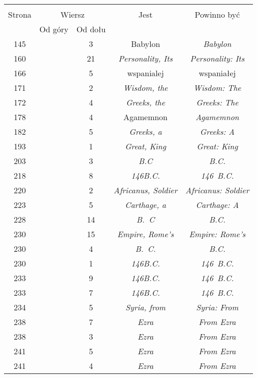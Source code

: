 \documentclass[a4paper,11pt]{article}
\begin{document}
\begin{center}
  \begin{tabular}{|c|c|c|c|c|}
    \hline
    & \multicolumn{2}{c|}{} & & \\
    Strona & \multicolumn{2}{c|}{Wiersz} & Jest
                              & Powinno być \\ \cline{2-3}
    & Od góry & Od dołu & & \\
    \hline
    145 & &  3 & Babylon & \textit{Babylon} \\
    160 & & 21 & \textit{Personality, Its} & \textit{Personality: Its} \\
    166 & &  5 & wspanialej & wspaniałej \\
    171 & &  2 & \textit{Wisdom, the} & \textit{Wisdom: The} \\
    172 & &  4 & \textit{Greeks, the} & \textit{Greeks: The} \\
    178 & &  4 & Agamemnon & \textit{Agamemnon} \\
    182 & &  5 & \textit{Greeks, a} & \textit{Greeks: A} \\
    193 & &  1 & \textit{Great, King} & \textit{Great: King} \\
    203 & &  3 & \textit{B.C} & \textit{B.C.} \\
    218 & &  8 & \textit{146B.C.} & \textit{146~B.C.} \\
    220 & &  2 & \textit{Africanus, Soldier}
           & \textit{Africanus: Soldier} \\
    223 & &  5 & \textit{Carthage, a} & \textit{Carthage: A} \\
    228 & & 14 & \textit{B.~C} & \textit{B.C.} \\
    230 & & 15 & \textit{Empire, Rome's} & \textit{Empire: Rome's} \\
    230 & &  4 & \textit{B.~C.} & \textit{B.C.} \\
    230 & &  1 & \textit{146B.C.} & \textit{146~B.C.} \\
    233 & &  9 & \textit{146B.C.} & \textit{146~B.C.} \\
    233 & &  7 & \textit{146B.C.} & \textit{146~B.C.} \\
    234 & &  5 & \textit{Syria, from} & \textit{Syria: From} \\
    238 & &  7 & \textit{Ezra} & \textit{From Ezra} \\
    238 & &  3 & \textit{Ezra} & \textit{From Ezra} \\
    241 & &  5 & \textit{Ezra} & \textit{From Ezra} \\
    241 & &  4 & \textit{Ezra} & \textit{From Ezra} \\

\end{tabular}
\end{center}
\end{document}

